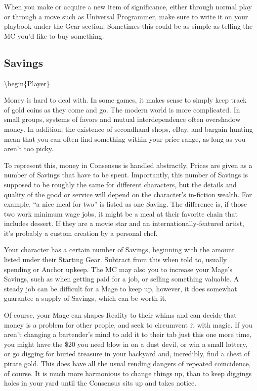 \documentclass[
  oneside,
  statementpaper,
  9pt]{memoir}
\begin{document}
\begin{Player}
When you make or acquire a new item of significance, either through normal play or through a move such as Universal Programmer, make sure to write it on your playbook under the Gear section. Sometimes this could be as simple as telling the MC you’d like to buy something.

\end{Player}

\hypertarget{savings}{%
\subsection{Savings}\label{savings}}

\textbackslash begin\{Player\}

Money is hard to deal with. In some games, it makes sense to simply keep
track of gold coins as they come and go. The modern world is more
complicated. In small groups, systems of favors and mutual
interdependence often overshadow money. In addition, the existence of
secondhand shops, eBay, and bargain hunting mean that you can often find
something within your price range, as long as you aren't too picky.

To represent this, money in Consensus is handled abstractly. Prices are
given as a number of Savings that have to be spent. Importantly, this
number of Savings is supposed to be roughly the same for different
characters, but the details and quality of the good or service will
depend on the character's in-fiction wealth. For example, ``a nice meal
for two'' is listed as one Saving. The difference is, if those two work
minimum wage jobs, it might be a meal at their favorite chain that
includes dessert. If they are a movie star and an
internationally-featured artist, it's probably a custom creation by a
personal chef.

Your character has a certain number of Savings, beginning with the
amount listed under their Starting Gear. Subtract from this when told
to, usually spending or Anchor upkeep. The MC may also you to increase
your Mage's Savings, such as when getting paid for a job, or selling
something valuable. A steady job can be difficult for a Mage to keep up,
however, it does somewhat guarantee a supply of Savings, which can be
worth it.

Of course, your Mage can shapes Reality to their whims and can decide
that money is a problem for other people, and seek to circumvent it with
magic. If you aren't changing a bartender's mind to add it to their tab
just this one more time, you might have the \$20 you need blow in on a
dust devil, or win a small lottery, or go digging for buried treasure in
your backyard and, incredibly, find a chest of pirate gold. This does
have all the usual rending dangers of repeated coincidence, of course.
It is much more harmonious to change things up, than to keep diggings
holes in your yard until the Consensus sits up and takes notice.
\end{document}
